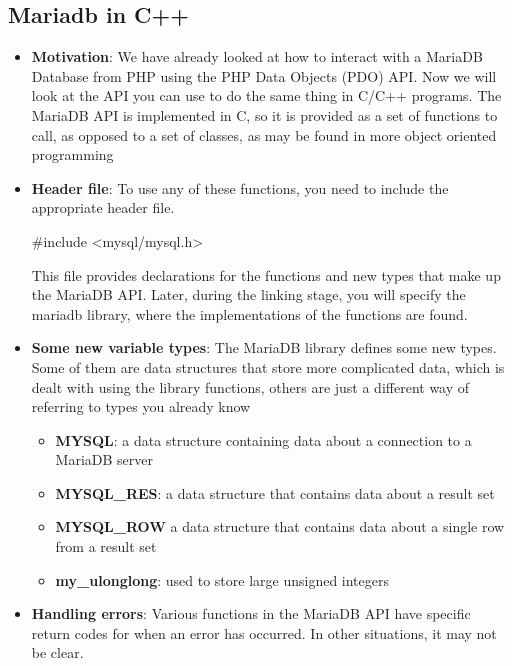 \documentclass{report}
\begin{document}
    \subsection{Mariadb in C++}
    \begin{itemize}
        \item \textbf{Motivation}: We have already looked at how to interact with a MariaDB Database from PHP using the PHP Data Objects (PDO) API. Now we will look at the API you can use to do the same thing in C/C++ programs.
            \bigbreak \noindent 
            The MariaDB API is implemented in C, so it is provided as a set of functions to call, as opposed to a set of classes, as may be found in more object oriented programming
        \item \textbf{Header file}: To use any of these functions, you need to include the appropriate header file.
            \bigbreak \noindent 
            \begin{cppcode}
                #include <mysql/mysql.h>
            \end{cppcode}
            \bigbreak \noindent 
            This file provides declarations for the functions and new types that make up the MariaDB API. Later, during the linking stage, you will specify the mariadb library, where the implementations of the functions are found.
        \item \textbf{Some new variable types}: The MariaDB library defines some new types. Some of them are data structures that store more complicated data, which is dealt with using the library functions, others are just a different way of referring to types you already know
            \begin{itemize}
                \item \textbf{MYSQL}: a data structure containing data about a connection to a MariaDB server
                \item \textbf{MYSQL\_RES}: a data structure that contains data about a result set
                \item \textbf{MYSQL\_ROW} a data structure that contains data about a single row from a result set
                \item \textbf{my\_ulonglong}: used to store large unsigned integers
            \end{itemize}
        \item \textbf{Handling errors}: Various functions in the MariaDB API have specific return codes for when an error has occurred. In other situations, it may not be clear.

\end{itemize}
\end{document}
